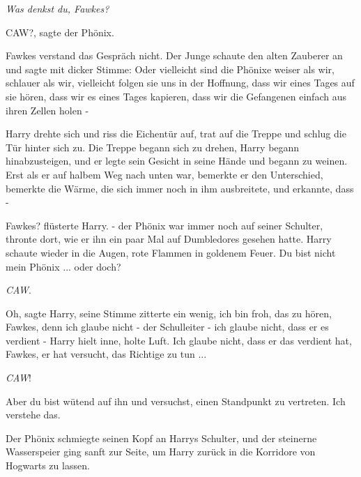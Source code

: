 \emph{Was denkst du, Fawkes?}

\glqq{}CAW?\grqq{}, sagte der Phönix.

Fawkes verstand das Gespräch nicht. Der Junge schaute den alten Zauberer an und
sagte mit dicker Stimme: \glqq{}Oder vielleicht sind die Phönixe weiser als wir,
schlauer als wir, vielleicht folgen sie uns in der Hoffnung, dass wir eines
Tages auf sie hören, dass wir es eines Tages kapieren, dass wir die Gefangenen
einfach aus ihren Zellen holen -\grqq{}

Harry drehte sich und riss die Eichentür auf, trat auf die Treppe und schlug die
Tür hinter sich zu. Die Treppe begann sich zu drehen, Harry begann
hinabzusteigen, und er legte sein Gesicht in seine Hände und begann zu weinen.
Erst als er auf halbem Weg nach unten war, bemerkte er den Unterschied, bemerkte
die Wärme, die sich immer noch in ihm ausbreitete, und erkannte, dass -

\glqq{}Fawkes? flüsterte Harry. - der Phönix war immer noch auf seiner Schulter,
thronte dort, wie er ihn ein paar Mal auf Dumbledores gesehen hatte. Harry
schaute wieder in die Augen, rote Flammen in goldenem Feuer. \glqq{}Du bist nicht
mein Phönix ... oder doch?\grqq{}

\emph{CAW}.

\glqq{}Oh\grqq{}, sagte Harry, seine Stimme zitterte ein wenig, \glqq{}ich bin
froh, das zu hören, Fawkes, denn ich glaube nicht - der Schulleiter - ich glaube
nicht, dass er es verdient -\grqq{} Harry hielt inne, holte Luft. \glqq{}Ich
glaube nicht, dass er das verdient hat, Fawkes, er hat versucht, das Richtige zu
tun ...\grqq{}

\emph{CAW}!

\glqq{}Aber du bist wütend auf ihn und versuchst, einen Standpunkt zu vertreten.
Ich verstehe das.\grqq{}

Der Phönix schmiegte seinen Kopf an Harrys Schulter, und der steinerne
Wasserspeier ging sanft zur Seite, um Harry zurück in die Korridore von Hogwarts
zu lassen.

